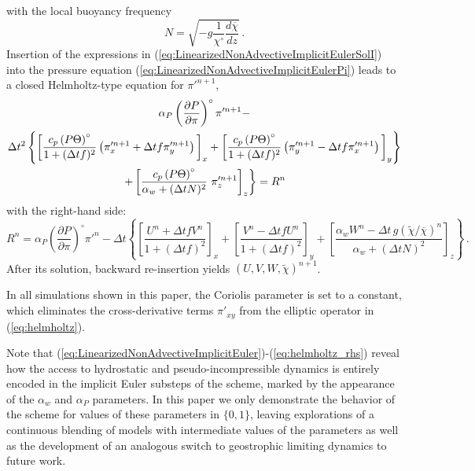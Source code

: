 \documentclass{ametsoc}
\theoremstyle{definition}
\newcommand{\eq}[1]{(\ref{#1})}
\newcommand{\dt}{\Delta t}
\newcommand{\chibar}{\overline{\chi}}
\newcommand{\chitilde}{{\widetilde \chi}}
\newcommand{\ahydro}{\alpha_{w}}
\newcommand{\apsinc}{\alpha_{P}}
\begin{document}
%
with the local buoyancy frequency
%
\begin{equation}
N = \sqrt{-g \frac{1}{\chi^{\circ}}\frac{d\chibar}{dz}}\,.
\end{equation}
%
Insertion of the expressions in \eq{eq:LinearizedNonAdvectiveImplicitEulerSolI}
into the pressure equation \eq{eq:LinearizedNonAdvectiveImplicitEulerPi} 
leads to a closed Helmholtz-type equation for ${\pi'}^{n+1}$, 
%
 \begin{multline}\label{eq:helmholtz}
 \apsinc \left(\dfrac{\partial P}{\partial\pi}\right)^{\circ}\pi'^{n+1} - \\
\dt^2 
\left\{ 
      \left[
        \dfrac{c_p \left(P\Theta\right)^{\circ}}{1+(\dt f)^2} 
          \left(\pi'^{n+1}_x+\dt f\pi'^{n+1}_y
          \right)
        \rule{0pt}{12pt}\right]_x
       +\left[
          \dfrac{c_p \left(P\Theta\right)^{\circ}}{1+(\dt f)^2} 
            \left(\pi'^{n+1}_y-\dt f\pi'^{n+1}_x
            \right)
         \rule{0pt}{12pt}\right]_y
      \right\}
    \\
    \left.
  + \left[\dfrac{c_p \left(P\Theta\right)^{\circ}}{\ahydro + (\dt N)^2} \ \pi'^{n+1}_z
      \rule{0pt}{12pt}\right]_z
    \right\}
  = R^n
 \end{multline}
%
with the right-hand side:
%
\begin{equation}\label{eq:helmholtz_rhs}
R^n= \apsinc \left(\dfrac{\partial P}{\partial\pi}\right)^{\circ}\pi'^n-
\dt
\left\{
\left[\dfrac{U^n +\dt f V^n}{1+(\dt f)^2}\right]_x  
+ \left[\dfrac{V^n - \dt f U^n}{1+(\dt f)^2}\right]_y
+\left[\dfrac{\ahydro W^n-\dt\, g\left(\chitilde/\chibar\right)^n}{\ahydro+(\dt N)^2}\right]_z\right\} \,.
\end{equation}
%
After its solution, backward re-insertion yields $(U, V, W, \chitilde)^{n+1}$.

In all simulations shown in this paper, the Coriolis parameter is set to a constant, which eliminates the cross-derivative terms $\pi'_{xy}$ from the elliptic operator in \eq{eq:helmholtz}.

Note that \eq{eq:LinearizedNonAdvectiveImplicitEuler}-\eq{eq:helmholtz_rhs} reveal how the access to hydrostatic and pseudo-incompressible dynamics is entirely encoded in the implicit Euler substeps of the scheme, marked by the appearance of the $\ahydro$ and $\apsinc$ parameters. In this paper we only demonstrate the behavior of the scheme for values of these parameters in $\{0,1\}$, leaving explorations of a continuous blending of models with intermediate values of the parameters as well as the development of an analogous switch to geostrophic limiting dynamics to future work.
\end{document}

